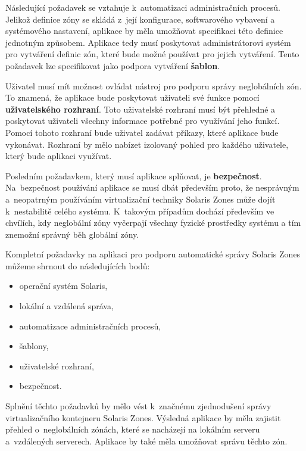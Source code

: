 Následující požadavek se vztahuje k~automatizaci administračních procesů. Jelikož definice zóny se skládá z~její
konfigurace, softwarového vybavení a systémového nastavení, aplikace by měla umožňovat specifikaci této definice 
jednotným způsobem. Aplikace tedy musí poskytovat administrátorovi systém pro vytváření definic zón, které bude možné
používat pro jejich vytváření. Tento požadavek lze specifikovat jako podpora vytváření \textbf{šablon}.

Uživatel musí mít možnost ovládat nástroj pro podporu správy neglobálních zón. To znamená, že aplikace bude
poskytovat uživateli své funkce pomocí \textbf{uživatelského rozhraní}. Toto uživatelské rozhraní musí být přehledné a poskytovat
uživateli všechny informace potřebné pro využívání jeho funkcí. Pomocí tohoto rozhraní bude uživatel zadávat příkazy, které
aplikace bude vykonávat. Rozhraní by mělo nabízet izolovaný pohled pro každého uživatele, který bude aplikaci využívat.

Posledním požadavkem, který musí aplikace splňovat, je \textbf{bezpečnost}. Na~bezpečnost používání aplikace se musí dbát především
proto, že nesprávným a~neopatrným používáním virtualizační techniky Solaris Zones může dojít k~nestabilitě celého systému.
K~takovým případům dochází především ve chvílích, kdy neglobální zóny vyčerpají všechny fyzické prostředky systému a tím
znemožní správný běh globální zóny.

Kompletní požadavky na aplikaci pro podporu automatické správy Solaris Zones můžeme shrnout do následujících bodů:
\begin{itemize}
 \item operační systém Solaris,
 \item lokální a vzdálená správa,
 \item automatizace administračních procesů,
 \item šablony,
 \item uživatelské rozhraní,
 \item bezpečnost.
\end{itemize}
Splnění těchto požadavků by mělo vést k~značnému zjednodušení správy virtualizačního kontejneru Solaris Zones. Výsledná
aplikace by měla zajistit přehled o~neglobálních zónách, které se nacházejí na lokálním serveru a~vzdálených serverech. Aplikace
by také měla umožňovat správu těchto zón. 
